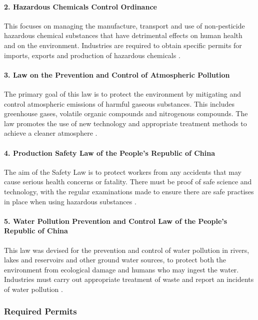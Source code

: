 \paragraph{2. Hazardous Chemicals Control Ordinance
}
This focuses on managing the manufacture, transport and use of non-pesticide hazardous chemical substances that have detrimental effects on human health and on the environment. Industries are required to obtain specific permits for imports, exports and production of hazardous chemicals \cite{govuk_hazardous_nodate}. 


\paragraph{3. Law on the Prevention and Control of Atmospheric Pollution}
The primary goal of this law is to protect the environment by mitigating and control atmospheric emissions of harmful gaseous substances. This includes greenhouse gases, volatile organic compounds and nitrogenous compounds. The law promotes the use of new technology and appropriate treatment methods to achieve a cleaner atmosphere \cite{vizzuality_law_nodate}. 

\paragraph{4. Production Safety Law of the People's Republic of China}
The aim of the Safety Law is to protect workers from any accidents that may cause serious health concerns or fatality. There must be proof of safe science and technology, with the regular examinations made to ensure there are safe practises in place when using hazardous substances \cite{standing_committee_of_the_national_peoples_congress_production_nodate}.  

\paragraph{5. Water Pollution Prevention and Control Law of the People's Republic of China  }
This law was devised for the prevention and control of water pollution in rivers, lakes and reservoirs and other ground water sources, to protect both the environment from ecological damage and humans who may ingest the water. Industries must carry out appropriate treatment of waste and report an incidents of water pollution \cite{govuk_waste_nodate}. 

\subsubsection{Required Permits}


